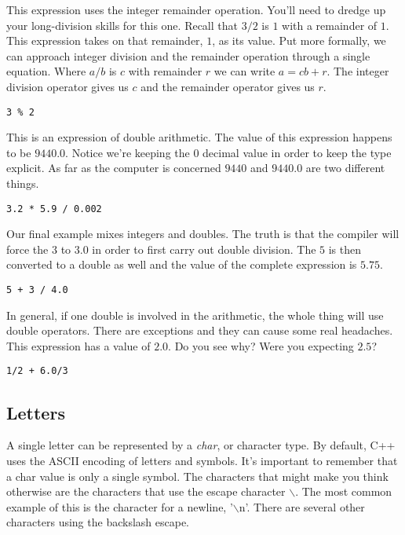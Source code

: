 \documentclass[]{tufte-handout}
\begin{document}
This expression uses the integer remainder operation. You'll need to dredge up your long-division skills for this one.  Recall that $3/2$ is $1$ with a remainder of $1$.  This expression takes on that remainder, $1$, as its value. Put more formally, we can approach integer division and the remainder operation through a single equation. Where $a/b$ is $c$ with remainder $r$ we can write $a = cb+r$. The integer division operator gives us $c$ and the remainder operator gives us $r$. 
\begin{verbatim}
3 % 2
\end{verbatim}

This is an expression of double arithmetic. The value of this expression happens to be $9440.0$.  Notice we're keeping the $0$ decimal value in order to keep the type explicit. As far as the computer is concerned $9440$ and $9440.0$ are two different things. 
\begin{verbatim}
3.2 * 5.9 / 0.002
\end{verbatim}

Our final example mixes integers and doubles.  The truth is that the compiler will force the $3$ to $3.0$ in order to first carry out double division. The $5$ is then converted to a double as well and the value of the complete expression is $5.75$.  
\begin{verbatim}
5 + 3 / 4.0 
\end{verbatim}

In general, if one double is involved in the arithmetic, the whole thing will use double operators. There are exceptions and they can cause some real headaches.  This expression has a value of $2.0$. Do you see why? Were you expecting $2.5$?	
\begin{verbatim}
1/2 + 6.0/3
\end{verbatim}

\subsection{Letters}

A single letter can be represented by a \textit{char}, or character type.  By default, C++ uses the ASCII encoding of letters and symbols. It's important to remember that a char value is only a single symbol.  The characters that might make you think otherwise are the characters that use the escape character $\backslash$.  The most common example of this is the character for a newline, '$\backslash$n'. There are several other characters using the backslash escape.  
\end{document}
